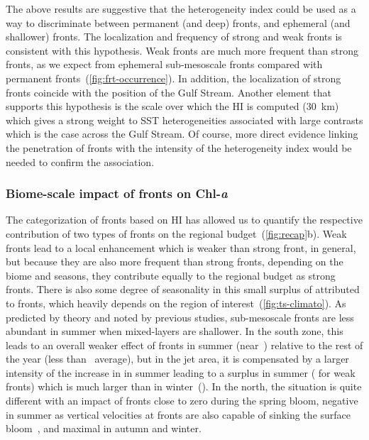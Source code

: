 The above results are suggestive that the heterogeneity index could be used as a way to discriminate between permanent (and deep) fronts, and ephemeral (and shallower) fronts.
The localization and frequency of strong and weak fronts is consistent with this hypothesis.
Weak fronts are much more frequent than strong fronts, as we expect from ephemeral sub-mesoscale fronts compared with permanent fronts~(\cref{fig:frt-occurrence}).
In addition, the localization of strong fronts coincide with the position of the Gulf Stream.
Another element that supports this hypothesis is the scale over which the HI is computed (\qty{30}{\km}) which gives a strong weight to SST heterogeneities associated with large contrasts which is the case across the Gulf Stream.
Of course, more direct evidence linking the penetration of fronts with the intensity of the heterogeneity index would be needed to confirm the association.

\subsubsection{Biome-scale impact of fronts on Chl-\textit{a}}

The categorization of fronts based on HI has allowed us to quantify the respective contribution of two types of fronts on the regional  budget~(\cref{fig:recap}b).
Weak fronts lead to a local  enhancement which is weaker than strong front, in general, but because they are also more frequent than strong fronts, depending on the biome and seasons, they contribute equally to the regional  budget as strong fronts.
There is also some degree of seasonality in this small surplus of  attributed to fronts, which heavily depends on the region of interest~(\cref{fig:ts-climato}).
As predicted by theory and noted by previous studies, sub-mesoscale fronts  are less abundant in summer when mixed-layers are shallower.
In the south zone, this leads to an overall weaker effect of fronts in summer (near~) relative to the rest of the year (less than~ average), but in the jet area, it is compensated by a larger intensity of the increase in  in summer leading to a  surplus in summer ( for weak fronts) which is much larger than in winter~().
In the north, the situation is quite different with an impact of fronts close to zero during the spring bloom, negative in summer as vertical velocities at fronts are also capable of sinking the surface bloom~\parencite{levy_2018}, and maximal in autumn and winter.

